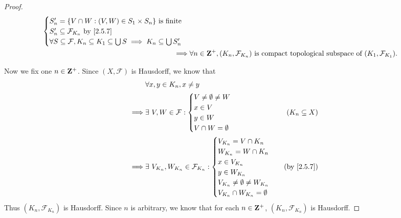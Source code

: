 \begin{proof}
\begin{align*}
\begin{cases}
                                                                                S_n' = \{V \cap W : (V, W) \in S_1 \times S_n\} \text{ is finite} \\
                                                                                S_n' \subseteq \mathcal{F}_{K_n} \text{ by \cref{2.5.7}}          \\
                                                                                \forall S \subseteq \mathcal{F}, K_n \subseteq K_1 \subseteq \bigcup S \implies K_n \subseteq \bigcup S_n'
                                                                              \end{cases} \\
    \implies & \forall n \in \Z^+, (K_n, \mathcal{F}_{K_n}) \text{ is compact topological subspace of } (K_1, \mathcal{F}_{K_1}).
  \end{align*}

  Now we fix one \(n \in \mathbf{Z}^+\).
  Since \((X, \mathcal{F})\) is Hausdorff, we know that
  \begin{align*}
             & \forall x, y \in K_n, x \neq y                                                           \\
    \implies & \exists\ V, W \in \mathcal{F} : \begin{cases}
                                                 V \neq \emptyset \neq W \\
                                                 x \in V                 \\
                                                 y \in W                 \\
                                                 V \cap W = \emptyset
                                               \end{cases}                   & (K_n \subseteq X)        \\
    \implies & \exists\ V_{K_n}, W_{K_n} \in \mathcal{F}_{K_n} : \begin{cases}
                                                                   V_{K_n} = V \cap K_n                \\
                                                                   W_{K_n} = W \cap K_n                \\
                                                                   x \in V_{K_n}                       \\
                                                                   y \in W_{K_n}                       \\
                                                                   V_{K_n} \neq \emptyset \neq W_{K_n} \\
                                                                   V_{K_n} \cap W_{K_n} = \emptyset
                                                                 \end{cases} & \text{(by \cref{2.5.7})}
  \end{align*}
  Thus \((K_n, \mathcal{F}_{K_n})\) is Hausdorff.
  Since \(n\) is arbitrary, we know that for each \(n \in \mathbf{Z}^+\), \((K_n, \mathcal{F}_{K_n})\) is Hausdorff.


\end{proof}
